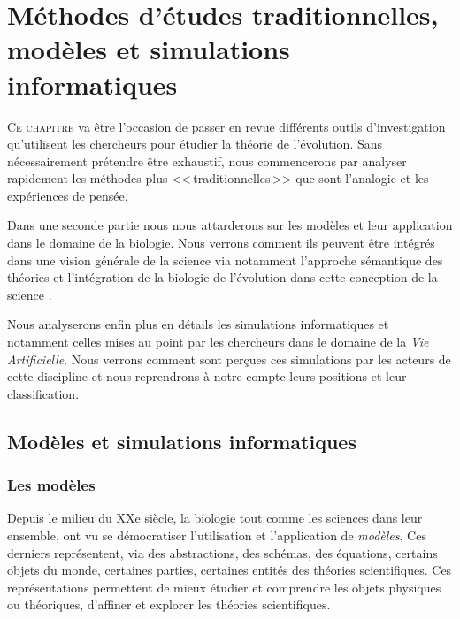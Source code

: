 \chapter{Méthodes d'études traditionnelles, modèles et simulations informatiques}\label{ch:methode}

\lettrine[lines=2]{C}{e chapitre} va être l'occasion de passer en revue différents outils d'investigation qu'utilisent les chercheurs pour étudier la théorie de l'évolution. Sans nécessairement prétendre être exhaustif, nous commencerons par analyser rapidement les méthodes plus <<\,traditionnelles\,>> que sont l'analogie et les expériences de pensée.

Dans une seconde partie nous nous attarderons sur les modèles et leur application dans le domaine de la biologie. Nous verrons comment ils peuvent être intégrés dans une vision générale de la science via notamment l'approche sémantique des théories \citep{vanfraassen1980thescientificimage,suppe1989thesemanticconceptionoftheoriesandscientificrealism} et l'intégration de la biologie de l'évolution dans cette conception de la science \citep{thompson1987adefenceofthesemanticconceptionofevolutionarytheory,lloyd1984asmanticapproachtothestructureofpopulationgenetics,beatty1980whatswrongwithreceivedwiew}.  

Nous analyserons enfin plus en détails les simulations informatiques et notamment celles mises au point par les chercheurs dans le domaine de la \emph{Vie Artificielle}. Nous verrons comment sont perçues ces simulations par les acteurs de cette discipline \citep{barandiaran06alifemodelsasepistemicartefacts} et nous reprendrons à notre compte leurs positions et leur classification.



\section{Modèles et simulations informatiques}\label{sec:cmpdr:va} 

\subsection{Les modèles}
Depuis le milieu du XXe siècle, la biologie tout comme les sciences dans leur ensemble, ont vu se démocratiser l'utilisation et l'application de \emph{modèles}. Ces derniers représentent, via des abstractions, des schémas, des équations, certains objets du monde, certaines parties, certaines entités des théories scientifiques. Ces représentations permettent de mieux étudier et comprendre les objets physiques ou théoriques, d'affiner et explorer les théories scientifiques. 

